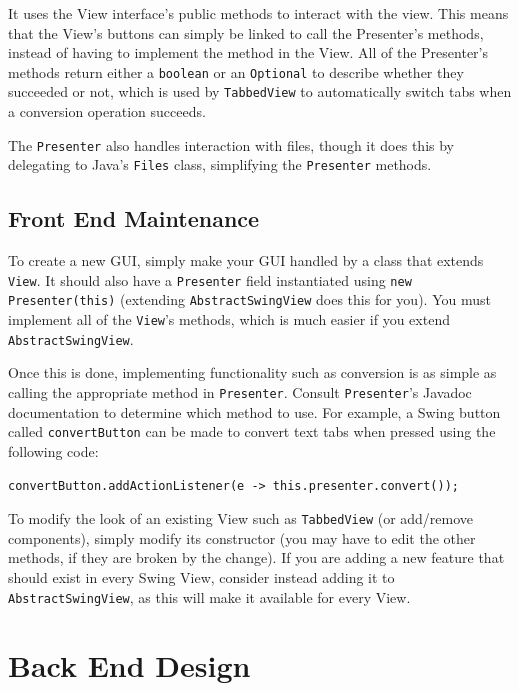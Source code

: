 \documentclass[11pt]{article}
\begin{document}
It uses the View interface's public methods to interact with the view.  This means that the View's buttons can simply be linked to call the Presenter's methods, instead of having to implement the method in the View.  All of the Presenter's methods return either a \texttt{boolean} or an \texttt{Optional} to describe whether they succeeded or not, which is used by \texttt{TabbedView} to automatically switch tabs when a conversion operation succeeds.

The \texttt{Presenter} also handles interaction with files, though it does this by delegating to Java's \texttt{Files} class, simplifying the \texttt{Presenter} methods.
\subsection{Front End Maintenance}
\label{sec:org7b1f441}
To create a new GUI, simply make your GUI handled by a class that extends \texttt{View}.  It should also have a \texttt{Presenter} field instantiated using \texttt{new Presenter(this)} (extending \texttt{AbstractSwingView} does this for you).  You must implement all of the \texttt{View}'s methods, which is much easier if you extend \texttt{AbstractSwingView}.

Once this is done, implementing functionality such as conversion is as simple as calling the appropriate method in \texttt{Presenter}.  Consult \texttt{Presenter}'s Javadoc documentation to determine which method to use.  For example, a Swing button called \texttt{convertButton} can be made to convert text tabs when pressed using the following code:
\begin{verbatim}
convertButton.addActionListener(e -> this.presenter.convert());
\end{verbatim}

To modify the look of an existing View such as \texttt{TabbedView} (or add/remove components), simply modify its constructor (you may have to edit the other methods, if they are broken by the change).  If you are adding a new feature that should exist in every Swing View, consider instead adding it to \texttt{AbstractSwingView}, as this will make it available for every View.

\newpage

\section{Back End Design}
\label{sec:orgcd0fdc8}
\end{document}
